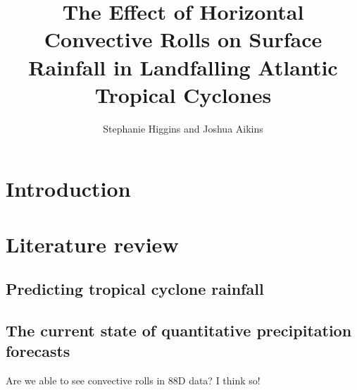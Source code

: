 \documentclass[12pt]{article}
\author{Stephanie Higgins and Joshua Aikins} \title{The Effect of Horizontal Convective Rolls on Surface Rainfall in Landfalling Atlantic Tropical Cyclones}
\begin{document}
\maketitle


\section{Introduction}

\section{Literature review}

\subsection{Predicting tropical cyclone rainfall} 

\subsection{The current state of quantitative precipitation forecasts}

Are we able to see convective rolls in 88D data?
I think so!
\end{document}
